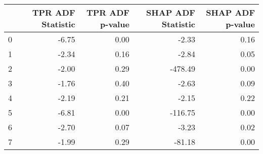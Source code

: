 \begin{tabular}{lrrrr}
\toprule
 & TPR ADF Statistic & TPR ADF p-value & SHAP ADF Statistic & SHAP ADF p-value \\
\midrule
0 & -6.75 & 0.00 & -2.33 & 0.16 \\
1 & -2.34 & 0.16 & -2.84 & 0.05 \\
2 & -2.00 & 0.29 & -478.49 & 0.00 \\
3 & -1.76 & 0.40 & -2.63 & 0.09 \\
4 & -2.19 & 0.21 & -2.15 & 0.22 \\
5 & -6.81 & 0.00 & -116.75 & 0.00 \\
6 & -2.70 & 0.07 & -3.23 & 0.02 \\
7 & -1.99 & 0.29 & -81.18 & 0.00 \\
\bottomrule
\end{tabular}
